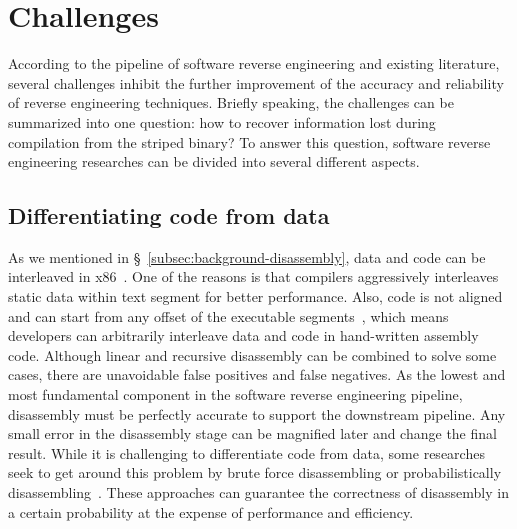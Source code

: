 \chapter{Challenges}\label{sec-challenges}

According to the pipeline of software reverse engineering and existing
literature, several challenges inhibit the further improvement of the accuracy
and reliability of reverse engineering techniques. Briefly speaking, the
challenges can be summarized into one question: how to recover information lost
during compilation from the striped binary? To answer this question, software
reverse engineering researches can be divided into several different aspects.

\section{Differentiating code from data} \label{sec:challenges-data-or-code}
As we mentioned in \S~\ref{subsec:background-disassembly}, data and code can be interleaved in x86~\cite{caballero2016type}. One of the reasons is that compilers aggressively interleaves static data within text segment for better performance. Also, code is not aligned and can start from any offset of the executable segments~\cite{bauman2018superset}, which means developers can arbitrarily interleave data and code in hand-written assembly code. Although linear and recursive disassembly can be combined to solve some cases, there are unavoidable false positives and false negatives. As the lowest and most fundamental component in the software reverse engineering pipeline, disassembly must be perfectly accurate to support the downstream pipeline. Any small error in the disassembly stage can be magnified later and change the final result.
While it is challenging to differentiate code from data, some researches seek to get around this problem by brute force disassembling or probabilistically disassembling~\cite{bauman2018superset,miller2019probabilistic}. These approaches can guarantee the correctness of disassembly in a certain probability at the expense of performance and efficiency.

